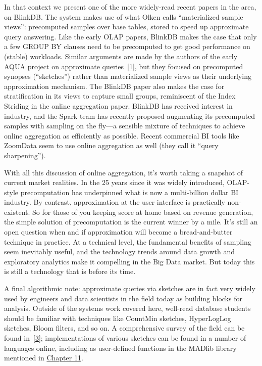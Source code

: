 \documentclass[b5paper,11pt,twoside,openright]{book}
\begin{document}
In that context we present one of the more widely-read recent papers in
the area, on BlinkDB. The system makes use of what Olken calls
``materialized sample views'': precomputed samples over base tables,
stored to speed up approximate query answering. Like the early OLAP
papers, BlinkDB makes the case that only a few GROUP BY clauses need to
be precomputed to get good performance on (stable) workloads. Similar
arguments are made by the authors of the early AQUA project on
approximate queries~{{[}\protect\hyperlink{ref-aqua}{1}{]}}, but they
focused on precomputed synopses (``sketches'') rather than materialized
sample views as their underlying approximation mechanism. The BlinkDB
paper also makes the case for stratification in its views to capture
small groups, reminiscent of the Index Striding in the online
aggregation paper. BlinkDB has received interest in industry, and the
Spark team has recently proposed augmenting its precomputed samples with
sampling on the fly---a sensible mixture of techniques to achieve online
aggregation as efficiently as possible. Recent commercial BI tools like
ZoomData seem to use online aggregation as well (they call it ``query
sharpening'').

With all this discussion of online aggregation, it's worth taking a
snapshot of current market realities. In the 25 years since it was
widely introduced, OLAP-style precomputation has underpinned what is now
a multi-billion dollar BI industry. By contrast, approximation at the
user interface is practically non-existent. So for those of you keeping
score at home based on revenue generation, the simple solution of
precomputation is the current winner by a mile. It's still an open
question when and if approximation will become a bread-and-butter
technique in practice. At a technical level, the fundamental benefits of
sampling seem inevitably useful, and the technology trends around data
growth and exploratory analytics make it compelling in the Big Data
market. But today this is still a technology that is before its time.

A final algorithmic note: approximate queries via sketches are in fact
very widely used by engineers and data scientists in the field today as
building blocks for analysis. Outside of the systems work covered here,
well-read database students should be familiar with techniques like
CountMin sketches, HyperLogLog sketches, Bloom filters, and so on. A
comprehensive survey of the field can be found
in~{{[}\protect\hyperlink{ref-fnt-sketch}{3}{]}}; implementations of
various sketches can be found in a number of languages online, including
as user-defined functions in the MADlib library mentioned in
\hyperref[ch11-complexanalytics]{Chapter 11}.
\end{document}
